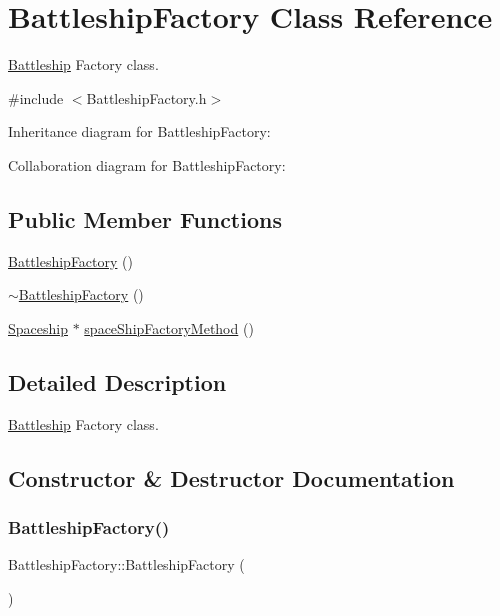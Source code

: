 \hypertarget{classBattleshipFactory}{}\section{Battleship\+Factory Class Reference}
\label{classBattleshipFactory}


\hyperlink{classBattleship}{Battleship} Factory class.  




{\ttfamily \#include $<$Battleship\+Factory.\+h$>$}



Inheritance diagram for Battleship\+Factory\+:


Collaboration diagram for Battleship\+Factory\+:
\subsection*{Public Member Functions}
\begin{DoxyCompactItemize}
\item 
\hyperlink{classBattleshipFactory_a98f1b363d37b3dcaaf066ba6f3dca375}{Battleship\+Factory} ()
\item 
\hyperlink{classBattleshipFactory_a18d29d1462e12301c49c2632144ff5e4}{$\sim$\+Battleship\+Factory} ()
\item 
\hyperlink{classSpaceship}{Spaceship} $\ast$ \hyperlink{classBattleshipFactory_a247e5af33c513bc110dbc73e84aa2bb1}{space\+Ship\+Factory\+Method} ()
\end{DoxyCompactItemize}


\subsection{Detailed Description}
\hyperlink{classBattleship}{Battleship} Factory class. 

\subsection{Constructor \& Destructor Documentation}
\mbox{\label{classBattleshipFactory_a98f1b363d37b3dcaaf066ba6f3dca375}} 
\subsubsection{\texorpdfstring{Battleship\+Factory()}{BattleshipFactory()}}
{\footnotesize\ttfamily Battleship\+Factory\+::\+Battleship\+Factory (\begin{DoxyParamCaption}{ }\end{DoxyParamCaption})}

